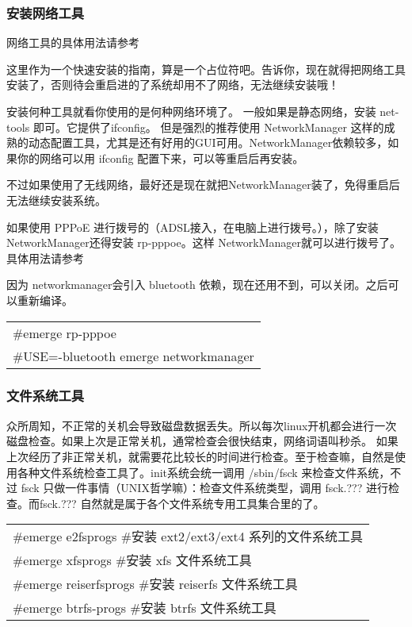 \documentclass[amstex,twoside]{ctexbook}
\newenvironment{code}{\small\tt\begin{longtable}{p{0.8\textwidth}}}{\end{longtable}}
\begin{document}
\subsubsection{安装网络工具}

网络工具的具体用法请参考 %

这里作为一个快速安装的指南，算是一个占位符吧。告诉你，现在就得把网络工具安装了，否则待会重启进的了系统却用不了网络，无法继续安装哦！

安装何种工具就看你使用的是何种网络环境了。
一般如果是静态网络，安装 net-tools 即可。它提供了ifconfig。
但是强烈的推荐使用 NetworkManager 这样的成熟的动态配置工具，尤其是还有好用的GUI可用。NetworkManager依赖较多，如果你的网络可以用 ifconfig 配置下来，可以等重启后再安装。

不过如果使用了无线网络，最好还是现在就把NetworkManager装了，免得重启后无法继续安装系统。

如果使用 PPPoE 进行拨号的（ADSL接入，在电脑上进行拨号。），除了安装NetworkManager还得安装 rp-pppoe。这样 NetworkManager就可以进行拨号了。具体用法请参考%

因为 networkmanager会引入 bluetooth 依赖，现在还用不到，可以关闭。之后可以重新编译。

\begin{code}
\#emerge rp-pppoe\\
\#USE=-bluetooth emerge networkmanager
\end{code}

\subsubsection{文件系统工具}

众所周知，不正常的关机会导致磁盘数据丢失。所以每次linux开机都会进行一次磁盘检查。如果上次是正常关机，通常检查会很快结束，网络词语叫秒杀。
如果上次经历了非正常关机，就需要花比较长的时间进行检查。至于检查嘛，自然是使用各种文件系统检查工具了。init系统会统一调用 /sbin/fsck 来检查文件系统，不过 fsck 只做一件事情（UNIX哲学嘛）：检查文件系统类型，调用 fsck.??? 进行检查。而fsck.??? 自然就是属于各个文件系统专用工具集合里的了。

\begin{code}
\#emerge e2fsprogs	\#安装 ext2/ext3/ext4 系列的文件系统工具\\
\#emerge xfsprogs	\#安装 xfs 文件系统工具\\
\#emerge reiserfsprogs	\#安装 reiserfs 文件系统工具\\
\#emerge btrfs-progs	\#安装 btrfs 文件系统工具\\
\end{code}
\end{document}
